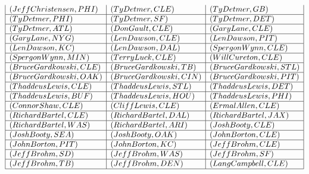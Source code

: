 \documentclass{ximera}
\begin{document}
\begin{center}
\[\begin{array}{|l|l|l|}
(Jeff Christensen, PHI) & (Ty Detmer, CLE) & (Ty Detmer, GB) \\\hline 


(Ty Detmer, PHI) & (Ty Detmer, SF) & (Ty Detmer, DET) \\\hline 


(Ty Detmer, ATL) & (Don Gault, CLE) & (Gary Lane, CLE) \\\hline 


(Gary Lane, NYG) & (Len Dawson, CLE) & (Len Dawson, PIT) \\\hline 


(Len Dawson, KC) & (Len Dawson, DAL) & (Spergon Wynn, CLE) \\\hline 


(Spergon Wynn, MIN) & (Terry Luck, CLE) & (Will Cureton, CLE) \\\hline 


(Bruce Gardkowski, CLE) & (Bruce Gardkowski, TB) & (Bruce Gardkowski, STL) \\\hline 


(Bruce Gardkowski, OAK) & (Bruce Gardkowski, CIN) & (Bruce Gardkowski, PIT) \\\hline 


(Thaddeus Lewis, CLE) & (Thaddeus Lewis, STL) & (Thaddeus Lewis, DET) \\\hline 


(Thaddeus Lewis, BUF) & (Thaddeus Lewis, HOU) & (Thaddeus Lewis, PHI) \\\hline 


(Connor Shaw, CLE) & (Cliff Lewis, CLE) & (Ermal Allen, CLE) \\\hline 


(Richard Bartel, CLE) & (Richard Bartel, DAL) & (Richard Bartel, JAX) \\\hline


(Richard Bartel, WAS) & (Richard Bartel, ARI) & (Josh Booty, CLE) \\\hline 


(Josh Booty, SEA) & (Josh Booty, OAK) & (John Borton, CLE) \\\hline


(John Borton, PIT) & (John Borton, KC) & (Jeff Brohm, CLE) \\\hline 


(Jeff Brohm, SD) & (Jeff Brohm, WAS) & (Jeff Brohm, SF) \\\hline 


(Jeff Brohm, TB) & (Jeff Brohm, DEN) & (Lang Campbell, CLE) \\\hline 



\end{array}\]
\end{center}
\end{document}
